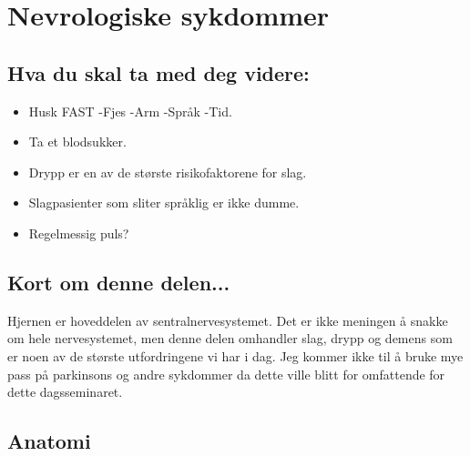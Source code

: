 \chapter{Nevrologiske sykdommer}
		\section{Hva du skal ta med deg videre:}
			\begin{itemize}
				\item Husk FAST -Fjes -Arm -Språk -Tid.\\
				\item Ta et blodsukker.\\
				\item Drypp er en av de største risikofaktorene for slag.\\
				\item Slagpasienter som sliter språklig er ikke dumme.\\
				\item Regelmessig puls?\\
			\end{itemize}
		\section{Kort om denne delen...}
			Hjernen er hoveddelen av sentralnervesystemet. Det er ikke meningen å snakke om hele nervesystemet, men denne delen omhandler slag, drypp og demens som er noen av de største utfordringene vi har i dag. Jeg kommer ikke til å bruke mye pass på parkinsons og andre sykdommer da dette ville blitt for omfattende for dette dagsseminaret.
		\section{Anatomi}
